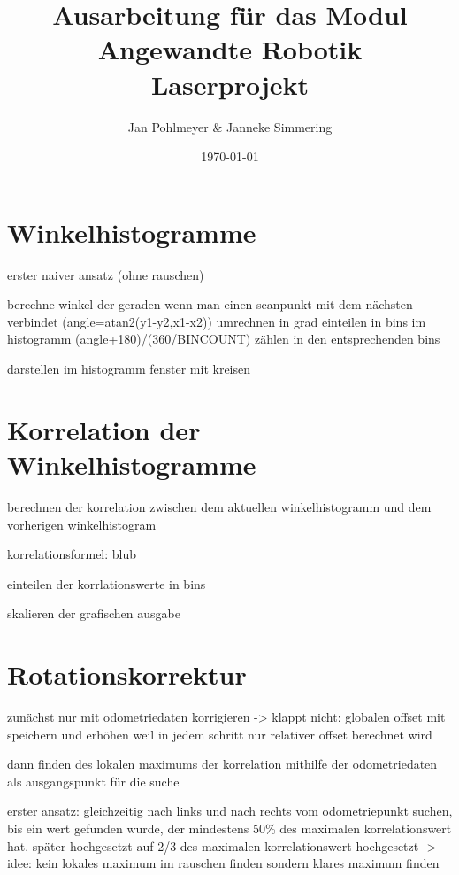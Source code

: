 \documentclass[12pt, a4paper]{article}
\title{\textbf{Ausarbeitung für das Modul Angewandte Robotik \\ Laserprojekt}}
\author{Jan Pohlmeyer \& Janneke Simmering}
\date{\today}
\begin{document}
\clearpage
\maketitle
\thispagestyle{empty}


\tableofcontents

\newpage



\section{Winkelhistogramme}

erster naiver ansatz (ohne rauschen)

berechne winkel der geraden wenn man einen scanpunkt mit dem nächsten verbindet (angle=atan2(y1-y2,x1-x2))
umrechnen in grad
einteilen in bins im histogramm (angle+180)/(360/BINCOUNT)
zählen in den entsprechenden bins

darstellen im histogramm fenster mit kreisen

\section{Korrelation der Winkelhistogramme}

berechnen der korrelation zwischen dem aktuellen winkelhistogramm und dem vorherigen winkelhistogram

korrelationsformel: blub

einteilen der korrlationswerte in bins

skalieren der grafischen ausgabe

\section{Rotationskorrektur}

zunächst nur mit odometriedaten korrigieren -> klappt nicht: globalen offset mit speichern und erhöhen weil in jedem schritt nur relativer offset berechnet wird

dann finden des lokalen maximums der korrelation mithilfe der odometriedaten als ausgangspunkt für die suche

erster ansatz: gleichzeitig nach links und nach rechts vom odometriepunkt suchen, bis ein wert gefunden wurde, der mindestens 50\% des maximalen korrelationswert hat. später hochgesetzt auf 2/3 des maximalen korrelationswert hochgesetzt -> idee: kein lokales maximum im rauschen finden sondern klares maximum finden
\end{document}

